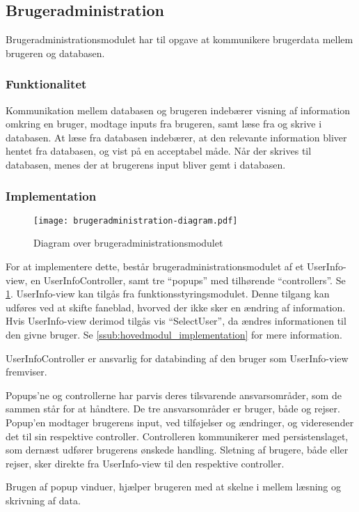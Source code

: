 \subsection{Brugeradministration}
\label{sub:Brugeradministration}

Brugeradministrationsmodulet har til opgave at kommunikere brugerdata mellem brugeren og databasen.

\subsubsection{Funktionalitet}
\label{ssub:Brugeradministration_funktionalitet}

Kommunikation mellem databasen og brugeren indebærer visning af information omkring en bruger, modtage inputs fra brugeren, samt læse fra og skrive i databasen. At læse fra databasen indebærer, at den relevante information bliver hentet fra databasen, og vist på en acceptabel måde. Når der skrives til databasen, menes der at brugerens input bliver gemt i databasen.

\subsubsection{Implementation}
\label{ssub:Brugeradministration_implementation}

\begin{figure}
  \centering
  \texttt{[image: brugeradministration-diagram.pdf]}
  \caption{Diagram over brugeradministrationsmodulet} \label{fig:brugermod}
\end{figure}

For at implementere dette, består brugeradministrationsmodulet af et UserInfo-view, en UserInfoController, samt tre \enquote{popups} med tilhørende \enquote{controllers}. Se \cref{fig:brugermod}. UserInfo-view kan tilgås fra funktionsstyringsmodulet. Denne tilgang kan udføres ved at skifte faneblad, hvorved der ikke sker en ændring af information. Hvis UserInfo-view derimod tilgås vis \enquote{SelectUser}, da ændres informationen til den givne bruger. Se \cref{ssub:hovedmodul_implementation} for mere information.

UserInfoController er ansvarlig for databinding af den bruger som UserInfo-view fremviser.

Popups'ne og controllerne har parvis deres tilsvarende ansvarsområder, som de sammen står for at håndtere. De tre ansvarsområder er bruger, både og rejser. Popup'en modtager brugerens input, ved tilføjelser og ændringer, og videresender det til sin respektive controller. Controlleren kommunikerer med persistenslaget, som dernæst udfører brugerens ønskede handling. Sletning af brugere, både eller rejser, sker direkte fra UserInfo-view til den respektive controller.

Brugen af popup vinduer, hjælper brugeren med at skelne i mellem læsning og skrivning af data.
